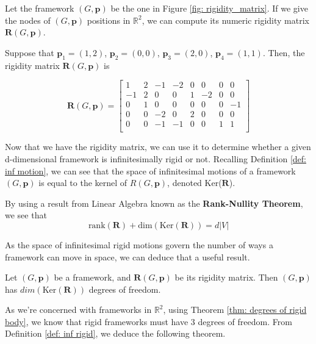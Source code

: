 \begin{example}
\label{eg: rigidity matrix}
Let the framework $(G,\mathbf{p})$ be the one in Figure \ref{fig: rigidity_matrix}. If we give the nodes of $(G,\mathbf{p})$ positions in $\mathbb{R}^2$, we can compute its numeric rigidity matrix $\mathbf{R}(G,\mathbf{p})$. 

\noindent
Suppose that $\mathbf{p}_1 = (1,2)$, $\mathbf{p}_2 = (0,0)$, $\mathbf{p}_3 = (2,0)$, $\mathbf{p}_4 = (1,1)$. Then, the rigidity matrix $\mathbf{R}(G,\mathbf{p})$ is

\[
\mathbf{R}(G,\mathbf{p}) = 
\begin{bmatrix}
1 & 2 & -1 & -2 & 0 & 0 & 0 & 0 \\
-1 & 2 & 0 & 0 & 1 & -2 & 0 & 0 \\
0 & 1 & 0 & 0 & 0 & 0 & 0 & -1 \\
0 & 0 & -2 & 0 & 2 & 0 & 0 & 0 \\
0 & 0 & -1 & -1 & 0 & 0 & 1 & 1 \\
\end{bmatrix}
\]
\end{example}

\begin{flushleft}
Now that we have the rigidity matrix, we can use it to determine whether a given d-dimensional framework is infinitesimally rigid or not. Recalling Definition \ref{def: inf motion}, we can see that the space of infinitesimal motions of a framework $(G,\mathbf{p})$ is equal to the kernel of $R(G,\mathbf{p})$, denoted Ker($\mathbf{R}$).

By using a result from Linear Algebra known as the \textbf{Rank-Nullity Theorem}, we see that
\vspace{-1 mm}
\[
\text{rank}(\mathbf{R}) + \text{dim}(\text{Ker}(\mathbf{R})) = d|V|
\]

\end{flushleft}

\begin{flushleft}
As the space of infinitesimal rigid motions govern the number of ways a framework can move in space, we can deduce that a useful result.
\end{flushleft}

\begin{lemma}
Let $(G,\mathbf{p})$ be a framework, and $\mathbf{R}(G,\mathbf{p})$ be its rigidity matrix. Then $(G,\mathbf{p})$ has $dim(\text{Ker}(\mathbf{R}))$ degrees of freedom. 
\end{lemma}

\begin{flushleft}
As we're concerned with frameworks in $\mathbb{R}^2$, using Theorem \ref{thm: degrees of rigid body}, we know that rigid frameworks must have $3$ degrees of freedom. From Definition \ref{def: inf rigid}, we deduce the following theorem.
\end{flushleft}

